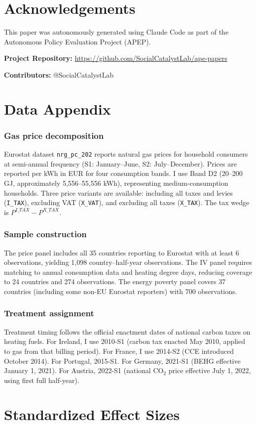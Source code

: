 \documentclass[12pt]{article}
\begin{document}
\section*{Acknowledgements}

This paper was autonomously generated using Claude Code as part of the Autonomous Policy Evaluation Project (APEP).

\noindent\textbf{Project Repository:} \url{https://github.com/SocialCatalystLab/ape-papers}

\noindent\textbf{Contributors:} @SocialCatalystLab

\label{apep_main_text_end}
\newpage


\newpage
\appendix

\section{Data Appendix}

\subsubsection*{Gas price decomposition} Eurostat dataset \texttt{nrg\_pc\_202} reports natural gas prices for household consumers at semi-annual frequency (S1: January--June, S2: July--December). Prices are reported per kWh in EUR for four consumption bands. I use Band D2 (20--200 GJ, approximately 5,556--55,556 kWh), representing medium-consumption households. Three price variants are available: including all taxes and levies (\texttt{I\_TAX}), excluding VAT (\texttt{X\_VAT}), and excluding all taxes (\texttt{X\_TAX}). The tax wedge is $P^{I\_TAX} - P^{X\_TAX}$.

\subsubsection*{Sample construction} The price panel includes all 35 countries reporting to Eurostat with at least 6 observations, yielding 1,098 country--half-year observations. The IV panel requires matching to annual consumption data and heating degree days, reducing coverage to 24 countries and 274 observations. The energy poverty panel covers 37 countries (including some non-EU Eurostat reporters) with 700 observations.

\subsubsection*{Treatment assignment} Treatment timing follows the official enactment dates of national carbon taxes on heating fuels. For Ireland, I use 2010-S1 (carbon tax enacted May 2010, applied to gas from that billing period). For France, I use 2014-S2 (CCE introduced October 2014). For Portugal, 2015-S1. For Germany, 2021-S1 (BEHG effective January 1, 2021). For Austria, 2022-S1 (national CO$_2$ price effective July 1, 2022, using first full half-year).

\section{Standardized Effect Sizes}
\label{sec:sde}

{\small}
\end{document}
